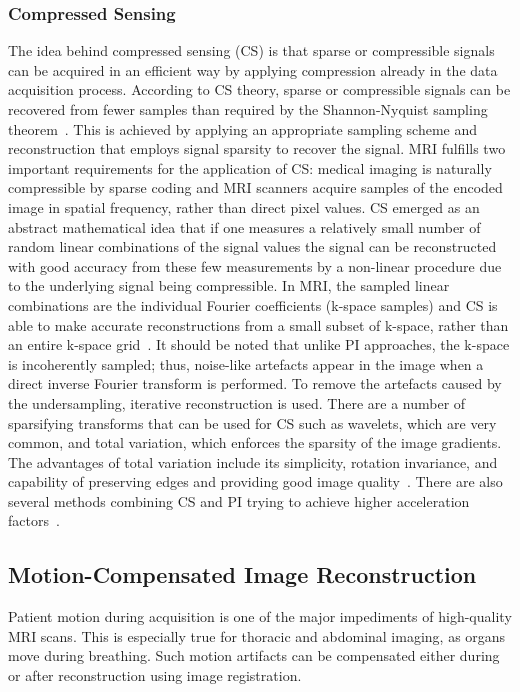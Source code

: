 \subsubsection{Compressed Sensing}
The idea behind compressed sensing (CS) is that sparse or compressible signals can be acquired in an efficient way by applying compression already in the data acquisition process. According to CS theory, sparse or compressible signals can be recovered from fewer samples than required by the Shannon-Nyquist sampling theorem~\cite{CS-MRI}. This is achieved by applying an appropriate sampling scheme and reconstruction that employs signal sparsity to recover the signal. MRI fulfills two important requirements for the application of CS: medical imaging is naturally compressible by sparse coding and MRI scanners acquire samples of the encoded image in spatial frequency, rather than direct pixel values. CS emerged as an abstract mathematical idea that if one measures a relatively small number of random linear combinations of the signal values the signal can be reconstructed with good accuracy from these few measurements by a non-linear procedure due to the underlying signal being compressible. In MRI, the sampled linear combinations are the individual Fourier coefficients (k-space samples) and CS is able to make accurate reconstructions from a small subset of k-space, rather than an entire k-space grid~\cite{CS-MRI}. It should be noted that unlike PI approaches, the k-space is incoherently sampled; thus, noise-like artefacts appear in the image when a direct inverse Fourier transform is performed. To remove the artefacts caused by the undersampling, iterative reconstruction is used. There are a number of sparsifying transforms that can be used for CS such as wavelets, which are very common, and total variation, which enforces the sparsity of the image gradients. The advantages of total variation include its simplicity, rotation invariance, and capability of preserving edges and providing good image quality~\cite{PulseSequences}. There are also several methods combining CS and PI trying to achieve higher acceleration factors~\cite{PI+CS, PI+CS2}.

\subsection{Motion-Compensated Image Reconstruction} \label{SubSec:Motion-CompensatedReconstruction}
Patient motion during acquisition is one of the major impediments of high-quality MRI scans. This is especially true for thoracic and abdominal imaging, as organs move during breathing. Such motion artifacts can be compensated either during or after reconstruction using image registration.


